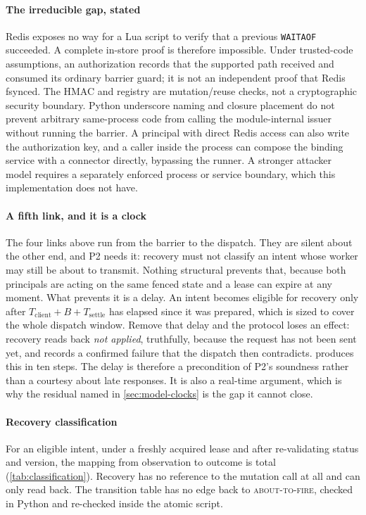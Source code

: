 \paragraph{The irreducible gap, stated} Redis exposes no way for a Lua script
to verify that a previous \texttt{WAITAOF} succeeded. A complete in-store proof
is therefore impossible. Under trusted-code assumptions, an authorization
records that the supported path received and consumed its ordinary barrier
guard; it is not an independent proof that Redis fsynced. The HMAC and registry
are mutation/reuse checks, not a cryptographic security boundary. Python
underscore naming and closure placement do not prevent arbitrary same-process
code from calling the module-internal issuer without running the barrier. A
principal with direct Redis access can also write the authorization key, and a
caller inside the process can compose the binding service with a connector
directly, bypassing the runner. A stronger attacker model requires a separately
enforced process or service boundary, which this implementation does not have.

\paragraph{A fifth link, and it is a clock} The four links above run from the
barrier to the dispatch. They are silent about the other end, and P2 needs it:
recovery must not classify an intent whose worker may still be about to
transmit. Nothing structural prevents that, because both principals are acting
on the same fenced state and a lease can expire at any moment. What prevents it
is a delay. An intent becomes eligible for recovery only after
$T_{\text{client}} + B + T_{\text{settle}}$ has elapsed since it was prepared,
which is sized to cover the whole dispatch window. Remove that delay and the
protocol loses an effect: recovery reads back \emph{not applied}, truthfully,
because the request has not been sent yet, and records a confirmed failure that
the dispatch then contradicts.  produces this in ten
steps. The delay is therefore a precondition of P2's soundness rather than a
courtesy about late responses. It is also a real-time argument, which is why
the residual named in \cref{sec:model-clocks} is the gap it cannot close.

\paragraph{Recovery classification} For an eligible intent, under a freshly
acquired lease and after re-validating status and version, the mapping from
observation to outcome is total (\cref{tab:classification}). Recovery has no
reference to the mutation call at all and can only read back. The
transition table has no edge back to \textsc{about-to-fire}, checked in Python
and re-checked inside the atomic script.

